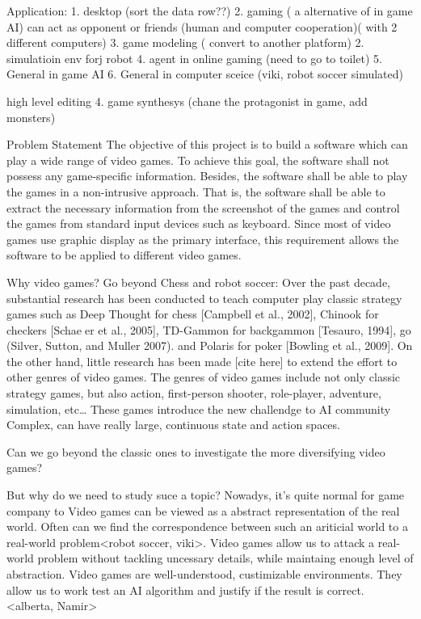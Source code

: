 Application:
1. desktop (sort the data row??)
2. gaming ( a alternative of in game AI) can act as opponent or friends (human and computer cooperation)( with 2 different computers)
3. game modeling ( convert to another platform)
2. simulatioin env forj robot
4. agent in online gaming (need to go to toilet)
5. General in game AI
6. General in computer sceice (viki, robot soccer simulated)

high level editing
4. game synthesys (chane the protagonist in game, add monsters)

Problem Statement
The objective of this project is to build a software which can play a wide range 
of video games. To achieve this goal, the software shall not possess any game-specific 
information. Besides, the software shall be able to play the games in a non-intrusive approach.
That is, the software shall be able to extract the necessary information 
from the screenshot of the games and control the games from standard input devices such as keyboard.
Since most of video games use graphic display as the primary interface, this requirement allows
the software to be applied to different video games.

Why video games?
Go beyond Chess and robot soccer:
Over the past decade, substantial research has been conducted to teach computer play classic strategy games such
as Deep Thought for chess [Campbell et al., 2002],
Chinook for checkers [Schaeer et al., 2005], TD-Gammon for backgammon [Tesauro, 1994],
go (Silver, Sutton, and Muller 2007).
and Polaris for poker [Bowling et al., 2009].
On the other hand, little research has been made [cite here] to extend the effort to other genres of video games.
The genres of video games include not only classic strategy games, but also action, first-person shooter, role-player, adventure, simulation, etc\ldots
These games introduce the new challendge to AI community
Complex, can have really large, continuous state and
action spaces.

Can we go beyond the classic ones to investigate the more diversifying video games? 

But why do we need to study suce a topic?
Nowadys, it's quite normal for game company to 
Video games can be viewed as a abstract representation of the real world. Often can we find the 
correspondence between such an ariticial world to a real-world problem<robot soccer, viki>.
Video games allow us to attack a real-world problem without tackling uncessary details, while maintaing enough 
level of abstraction.
Video games are well-understood, custimizable environments. They allow us to work test an AI algorithm
and justify if the result is correct. <alberta, Namir>

